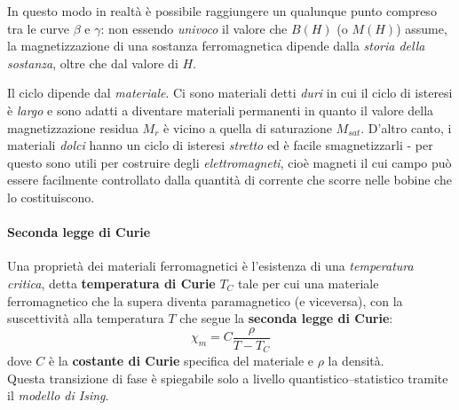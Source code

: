 In questo modo in realtà è possibile raggiungere un qualunque punto compreso tra le curve $\beta$ e $\gamma$: non essendo \textit{univoco} il valore che $B(H)$ (o $M(H)$) assume, la magnetizzazione di una sostanza ferromagnetica dipende dalla \textit{storia della sostanza}, oltre che dal valore di $H$.
\begin{observe}
	Il ciclo dipende dal \textit{materiale}. Ci sono materiali detti \textit{duri} in cui il ciclo di isteresi è \textit{largo} e sono adatti a diventare materiali permanenti in quanto il valore della magnetizzazione residua $M_r$ è vicino a quella di saturazione $M_{sat}$. D'altro canto, i materiali \textit{dolci} hanno un ciclo di isteresi \textit{stretto} ed è facile smagnetizzarli - per questo sono utili per costruire degli \textit{elettromagneti}, cioè magneti il cui campo può essere facilmente controllato dalla quantità di corrente che scorre nelle bobine che lo costituiscono.
\end{observe}
\paragraph{Seconda legge di Curie}
Una proprietà dei materiali ferromagnetici è l'esistenza di una \textit{temperatura critica}, detta \textbf{temperatura di Curie} $T_C$ tale per cui una materiale ferromagnetico che la supera diventa paramagnetico (e viceversa), con la suscettività alla temperatura $T$ che segue la \textbf{seconda legge di Curie}:
\begin{equation}
	\chi_m=C\frac{\rho}{T-T_C}
\end{equation}
dove $C$ è la \textbf{costante di Curie} specifica del materiale e $\rho$ la densità.\\
Questa transizione di fase è spiegabile solo a livello quantistico--statistico tramite il \textit{modello di Ising}.